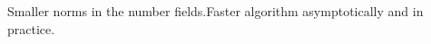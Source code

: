 \documentclass[preview]{standalone}
\begin{document}
Smaller norms in the number fields.Faster algorithm asymptotically and in practice. \\
\end{document}
